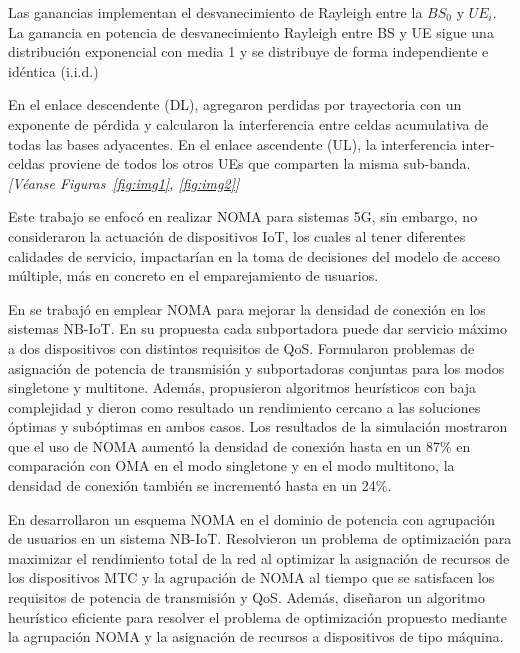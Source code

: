Las ganancias implementan el desvanecimiento de Rayleigh entre la $BS_0$ y $UE_i$. La ganancia en potencia de desvanecimiento Rayleigh entre BS y UE sigue una distribución exponencial con media 1 y se distribuye de forma independiente e idéntica (i.i.d.)\newline

En el enlace descendente (DL), agregaron perdidas por trayectoria con un exponente de pérdida y calcularon la interferencia entre celdas acumulativa de todas las bases adyacentes. En el enlace ascendente (UL), la interferencia inter-celdas proviene de todos los otros UEs que comparten la misma sub-banda. \textit{[Véanse Figuras~\ref{fig:img1}, \ref{fig:img2}]}\newline

Este trabajo se enfocó en realizar NOMA para sistemas 5G, sin embargo, no consideraron la actuación de dispositivos IoT, los cuales al tener diferentes calidades de servicio, impactarían en la toma de decisiones del modelo de acceso múltiple, más en concreto en el emparejamiento de usuarios.\newline

En \parencite{Mostafa2019} se trabajó en emplear NOMA para mejorar la densidad de conexión en los sistemas NB-IoT. En su propuesta cada subportadora puede dar servicio máximo a dos dispositivos con distintos requisitos de QoS. Formularon problemas de asignación de potencia de transmisión y subportadoras conjuntas para los modos singletone y multitone.  Además, propusieron algoritmos heurísticos con baja complejidad y dieron como resultado un rendimiento cercano a las soluciones óptimas y subóptimas en ambos casos. Los resultados de la simulación mostraron que el uso de NOMA aumentó la densidad de conexión hasta en un 87\% en comparación con OMA en el modo singletone y en el modo multitono, la densidad de conexión también se incrementó hasta en un 24\%.\newline

En \parencite{Shahini2019} desarrollaron un esquema NOMA en el dominio de potencia con agrupación de usuarios en un sistema NB-IoT. Resolvieron un problema de optimización para maximizar el rendimiento total de la red al optimizar la asignación de recursos de los dispositivos MTC y la agrupación de NOMA al tiempo que se satisfacen los requisitos de potencia de transmisión y QoS. Además, diseñaron un algoritmo heurístico eficiente para resolver el problema de optimización propuesto mediante la agrupación NOMA y la asignación de recursos a dispositivos de tipo máquina.\newline

